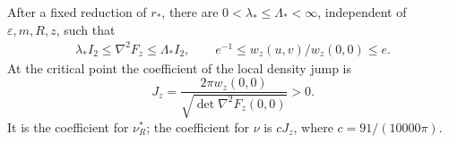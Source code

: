 \begin{lemma}
\label{lem:v45-relative-distortion}
After a fixed reduction of $r_*$, there are
$0<\lambda_*\le\Lambda_*<\infty$, independent of
$\varepsilon,m,R,z$, such that
\begin{align}
 \lambda_* I_2\le\nabla^2 F_z\le
                         \Lambda_* I_2,\qquad
 e^{-1}\le w_z(u,v)/w_z(0,0)\le e.
 \label{eq:v45-relative-collar}
\end{align}
At the critical point the coefficient of the local density jump is
\begin{equation}\label{eq:v45-intrinsic-jump}
 J_z=\frac{2\pi w_z(0,0)}{\sqrt{\det\nabla^2F_z(0,0)}}>0.
\end{equation}
It is the coefficient for $\nu_R^*$; the coefficient for $\nu$ is
$cJ_z$, where $c=91/(10000\pi)$.
\end{lemma}
